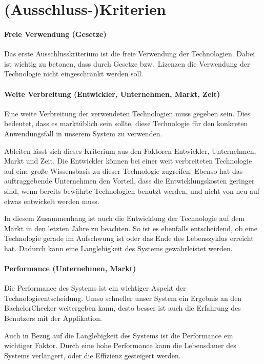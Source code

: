 \section{(Ausschluss-)Kriterien}\label{sec:ausschlusskriterien}

\paragraph{Freie Verwendung (Gesetze)}\label{par:freie-verwendung}
Das erste Ausschlusskriterium ist die freie Verwendung der Technologien.
Dabei ist wichtig zu betonen, dass durch Gesetze bzw.\ Lizenzen die
Verwendung der Technologie nicht eingeschränkt werden soll.

\paragraph{Weite Verbreitung (Entwickler, Unternehmen, Markt, Zeit)}\label{par:weite-verbreitung}
Eine weite Verbreitung der verwendeten Technologien muss gegeben sein.
Dies bedeutet, dass es marktüblich sein sollte, diese Technologie für den
konkreten Anwendungsfall in unserem System zu verwenden.

Ableiten lässt sich dieses Kriterium aus den Faktoren Entwickler, Unternehmen, Markt und Zeit.
Die Entwickler können bei einer weit verbreiteten Technologie
auf eine große Wissensbasis zu dieser Technologie zugreifen.
Ebenso hat das auftraggebende Unternehmen den Vorteil, dass die Entwicklungskosten geringer sind,
wenn bereits bewährte Technologien benutzt werden, und nicht von neu auf etwas entwickelt werden muss.

In diesem Zusammenhang ist auch die Entwicklung der Technologie auf dem
Markt in den letzten Jahre zu beachten.
So ist es ebenfalls entscheidend, ob eine Technologie gerade im Aufschwung
ist oder das Ende des Lebenszyklus erreicht hat.
Dadurch kann eine Langlebigkeit des Systems gewährleistet werden.

\paragraph{Performance (Unternehmen, Markt)}\label{par:performance}
Die Performance des Systems ist ein wichtiger Aspekt der Technologieentscheidung.
Umso schneller unser System ein Ergebnis an den BachelorChecker weitergeben kann,
desto besser ist auch die Erfahrung des Benutzers mit der Applikation.

Auch in Bezug auf die Langlebigkeit des Systems ist die Performance ein wichtiger Faktor.
Durch eine hohe Performance kann die Lebensdauer des Systems verlängert, oder die Effizienz gesteigert werden.

